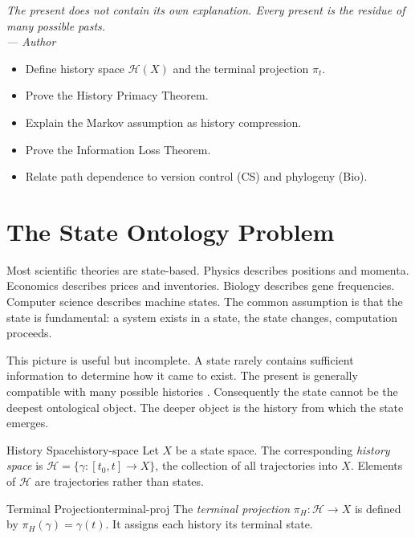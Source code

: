 \documentclass[12pt,twoside,openright]{book}
\newcommand{\hist}{\mathcal{H}}
\newenvironment{epigraph}[2]{%
  \vspace{1em}\begin{flushright}
  \begin{minipage}{0.72\textwidth}
  \itshape\small #1\\[0.4em]
  \upshape\footnotesize\sffamily\color{DistGray}--- #2
  \end{minipage}\end{flushright}\vspace{1.5em}}{}
\newenvironment{objectives}{%
  \begin{tcolorbox}[colback=DistBlue!5,colframe=DistBlue,
    title={\faCheckCircle\enspace Learning Objectives},
    fonttitle=\sffamily\bfseries\color{white},
    attach boxed title to top left={yshift=-2mm,xshift=4mm},
    boxed title style={colback=DistBlue},breakable]
  \begin{itemize}[leftmargin=*,nosep]}{%
  \end{itemize}\end{tcolorbox}\vspace{1em}}
\begin{document}
\begin{epigraph}{The present does not contain its own
  explanation. Every present is the residue of many
  possible pasts.}{Author}
\end{epigraph}

\begin{objectives}
  \item Define history space $\hist(X)$ and the terminal
        projection $\pi_t$.
  \item Prove the History Primacy Theorem.
  \item Explain the Markov assumption as history
        compression.
  \item Prove the Information Loss Theorem.
  \item Relate path dependence to version control (CS)
        and phylogeny (Bio).
\end{objectives}

\section{The State Ontology Problem}
\label{sec:ch4-state}

Most scientific theories are state-based. Physics describes
positions and momenta. Economics describes prices and
inventories. Biology describes gene frequencies. Computer
science describes machine states. The common assumption is
that the state is fundamental: a system exists in a state,
the state changes, computation proceeds.

This picture is useful but incomplete. A state rarely
contains sufficient information to determine how it came
to exist. The present is generally compatible with many
possible histories \parencite{whitehead1929,bergson1896}.
Consequently the state cannot be the deepest ontological
object. The deeper object is the history from which the
state emerges.

\begin{definition}{History Space}{history-space}
  Let $X$ be a state space. The corresponding
  \emph{history space} is
  $\hist = \{\gamma : [t_0, t] \to X\}$,
  the collection of all trajectories into $X$.
  Elements of $\hist$ are trajectories rather than states.
\end{definition}

\begin{definition}{Terminal Projection}{terminal-proj}
  The \emph{terminal projection}
  $\pi_H: \hist \to X$ is defined by
  $\pi_H(\gamma) = \gamma(t)$.
  It assigns each history its terminal state.
\end{definition}
\end{document}
